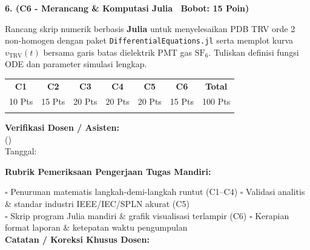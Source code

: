 \documentclass[10pt,a4paper]{article}
\begin{document}
\vspace{3.5mm}

\noindent\textbf{6. (C6 - Merancang \& Komputasi Julia \textbar\ Bobot: 15 Poin)}\par\vspace{0.8mm}
{\footnotesize Rancang skrip numerik berbasis \textbf{Julia} untuk menyelesaikan PDB TRV orde 2 non-homogen dengan paket \texttt{Differential\-Equations.jl} serta memplot kurva $v_{\text{TRV}}(t)$ bersama garis batas dielektrik PMT gas $\text{SF}_6$. Tuliskan definisi fungsi ODE dan parameter simulasi lengkap.}\par

\vfill

\noindent\begin{minipage}[b]{0.62\textwidth}%
  \centering
  \scriptsize
  \begin{tabular}{|c|c|c|c|c|c|c|}
    \hline
    \rowcolor{unibblue}
    \textbf{\color{white}C1} & \textbf{\color{white}C2} & \textbf{\color{white}C3} & \textbf{\color{white}C4} & \textbf{\color{white}C5} & \textbf{\color{white}C6} & \textbf{\color{white}Total} \\
    \rowcolor{unibblue!10}
    10 Pts & 15 Pts & 20 Pts & 20 Pts & 20 Pts & 15 Pts & 100 Pts \\
    \hline
    & & & & & & \\[3mm]
    \hline
  \end{tabular}%
\end{minipage}%
\hfill%
\begin{minipage}[b]{0.35\textwidth}%
  \centering
  \scriptsize
  \textbf{Verifikasi Dosen / Asisten:}\\[6mm]
  (\dotfill)\\[1mm]
  \tiny Tanggal: \dotfill
\end{minipage}\par

\vspace{2mm}
\begin{tcolorbox}[colback=white,colframe=unibblue!40!black,colbacktitle=unibblue!10,coltitle=unibblue,boxrule=0.5pt,arc=2pt,left=5pt,right=5pt,top=3pt,bottom=3pt,title=\textbf{\tiny Catatan Evaluasi \& Umpan Balik Dosen Pengampu}]
  \tiny
  \textbf{Rubrik Pemeriksaan Pengerjaan Tugas Mandiri:}\par\vspace{0.8mm}
  $\square$ Penurunan matematis langkah-demi-langkah runtut (C1--C4) \hfill $\square$ Validasi analitis \& standar industri IEEE/IEC/SPLN akurat (C5)\\[0.8mm]
  $\square$ Skrip program Julia mandiri \& grafik visualisasi terlampir (C6) \hfill $\square$ Kerapian format laporan \& ketepatan waktu pengumpulan\\[2.0mm]
  \textbf{Catatan / Koreksi Khusus Dosen:}\\[1.6cm]
\end{tcolorbox}
\end{document}
